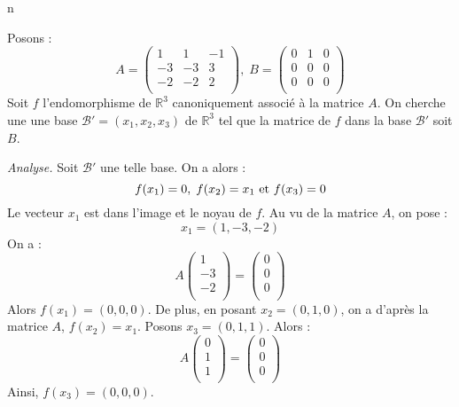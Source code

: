 n\documentclass[a4paper,10pt]{report}
\begin{document}
\corr Posons :
$$ A = \begin{pmatrix}
1 & 1 & -1 \\
-3 & -3 & 3 \\
-2 & -2 & 2 \\
\end{pmatrix}, \;   B = \begin{pmatrix}
0 & 1 & 0 \\
0 & 0 & 0 \\
0 & 0 & 0 \\
\end{pmatrix}$$
Soit $f$ l'endomorphisme  de $\mathbb{R}^3$ canoniquement associé à la matrice $A$. On cherche une une base $\mathcal{B}'=(x_1,x_2,x_3)$ de $\mathbb{R}^3$ tel que la matrice de $f$ dans la base $\mathcal{B}'$ soit $B$. 

\medskip

\noindent \textit{Analyse.} Soit $\mathcal{B}'$ une telle base. On a alors :
$$ f(x_1)=0, \; f(x_2)=x_1 \hbox{ et } f(x_3)=0$$
Le vecteur $x_1$ est dans l'image et le noyau de $f$. Au vu de la matrice $A$, on pose :
$$ x_1 =(1,-3,-2)$$
On a :
$$ A \begin{pmatrix}
1 \\
-3 \\
-2\\
\end{pmatrix} = \begin{pmatrix}
0 \\
0 \\
0\\
\end{pmatrix}$$
Alors $f(x_1)=(0,0,0)$. De plus, en posant $x_2=(0,1,0)$, on a d'après la matrice $A$, $f(x_2)=x_1$. Posons $x_3=(0,1,1)$. Alors :
$$  A \begin{pmatrix}
0 \\
1 \\
1\\
\end{pmatrix} = \begin{pmatrix}
0 \\
0\\
0\\
\end{pmatrix}$$
Ainsi, $f(x_3)=(0,0,0)$.

\medskip
\end{document}
